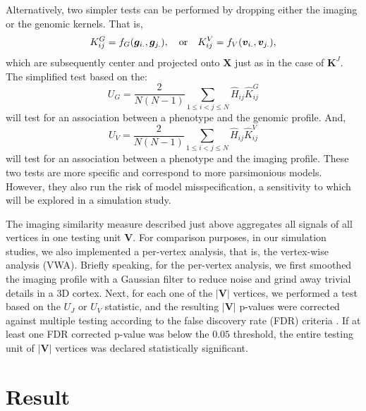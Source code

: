 \documentclass[11pt]{article}
\newcommand{\bs}{\boldsymbol}
\begin{document}
Alternatively, two simpler tests can be performed by dropping either the imaging or the genomic kernels. That is,
\[ K_{ij}^G = f_G(\boldsymbol{g}_{i.}, \boldsymbol{g}_{j.}), \quad \text{or}\quad K_{ij}^V = f_V(\boldsymbol{v}_{i.}, \boldsymbol{v}_{j.}), \]
which are subsequently center and projected onto $\bs{X}$ just as in the case of $\bs{K}^J$. The simplified test based on the:
\[ U_G = \frac{2}{N(N-1)} \sum_{1 \leq i < j \leq N}^{} \hat{H}_{ij} \hat{K}_{ij}^G \]
will test for an association between a phenotype and the genomic profile. And,
\[ U_V = \frac{2}{N(N-1)} \sum_{1 \leq i < j \leq N}^{} \hat{H}_{ij} \hat{K}_{ij}^V \]
will test for an association between a phenotype and the imaging profile. These two tests are more specific and correspond to more parsimonious models. However, they also run the risk of model misspecification, a sensitivity to which will be explored in a simulation study.

The imaging similarity measure described just above aggregates all signals of all vertices in one testing unit $\bs{V}$. For comparison purposes, in our simulation studies, we also implemented a per-vertex analysis, that is, the vertex-wise analysis (VWA). Briefly speaking, for the per-vertex analysis, we first smoothed the imaging profile with a Gaussian filter to reduce noise and grind away trivial details in a 3D cortex. Next, for each one of the $|\bs{V}|$ vertices, we performed a test based on the $U_J$ or $U_V$ statistic, and the resulting $|\bs{V}|$ p-values were corrected against multiple testing according to the false discovery rate (FDR) criteria \citep{FDR}. If at least one FDR corrected p-value was below the $0.05$ threshold, the entire testing unit of $|\bs{V}|$ vertices was declared statistically significant.

\section*{Result}
\end{document}
